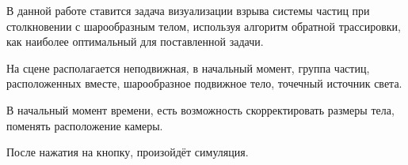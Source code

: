 В данной работе ставится задача визуализации взрыва системы частиц при столкновении с шарообразным телом, используя алгоритм обратной трассировки, как наиболее оптимальный для поставленной задачи. 

На сцене располагается неподвижная, в начальный момент, группа частиц, расположенных вместе, шарообразное подвижное тело, точечный источник света.
	
В начальный момент времени, есть возможность скорректировать размеры тела, поменять расположение камеры.
	
После нажатия на кнопку, произойдёт симуляция.
